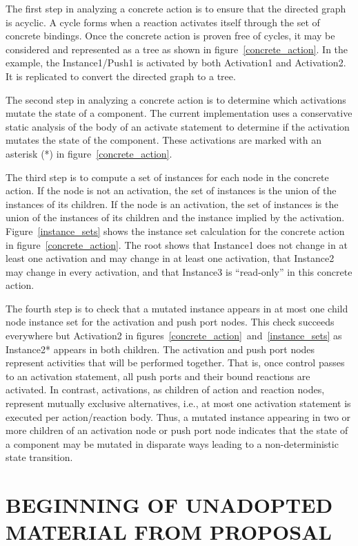 The first step in analyzing a concrete action is to ensure that the directed graph is acyclic.
A cycle forms when a reaction activates itself through the set of concrete bindings.
Once the concrete action is proven free of cycles, it may be considered and represented as a tree as shown in figure~\ref{concrete_action}.
In the example, the Instance1/Push1 is activated by both Activation1 and Activation2.
It is replicated to convert the directed graph to a tree.

The second step in analyzing a concrete action is to determine which activations mutate the state of a component.
The current implementation uses a conservative static analysis of the body of an activate statement to determine if the activation mutates the state of the component.
These activations are marked with an asterisk (*) in figure~\ref{concrete_action}.

The third step is to compute a set of instances for each node in the concrete action.
If the node is not an activation, the set of instances is the union of the instances of its children.
If the node is an activation, the set of instances is the union of the instances of its children and the instance implied by the activation.
Figure~\ref{instance_sets} shows the instance set calculation for the concrete action in figure~\ref{concrete_action}.
The root shows that Instance1 does not change in at least one activation and may change in at least one activation, that Instance2 may change in every activation, and that Instance3 is ``read-only'' in this concrete action.

The fourth step is to check that a mutated instance appears in at most one child node instance set for the activation and push port nodes.
This check succeeds everywhere but Activation2 in figures~\ref{concrete_action}~and~\ref{instance_sets} as Instance2* appears in both children.
The activation and push port nodes represent activities that will be performed together.
That is, once control passes to an activation statement, all push ports and their bound reactions are activated.
In contrast, activations, as children of action and reaction nodes, represent mutually exclusive alternatives, i.e., at most one activation statement is executed per action/reaction body.
Thus, a mutated instance appearing in two or more children of an activation node or push port node indicates that the state of a component may be mutated in disparate ways leading to a non-deterministic state transition.

\section{BEGINNING OF UNADOPTED MATERIAL FROM PROPOSAL}

